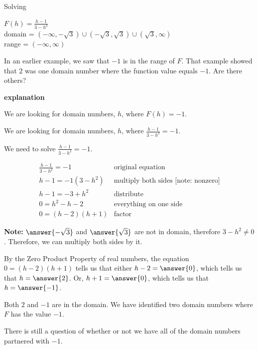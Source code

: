 \documentclass{ximera}
\begin{document}
\begin{example}   Solving 

$F(h) = \frac{h-1}{3-h^2}$ \\
domain = $(-\infty, -\sqrt{3}) \cup (-\sqrt{3}, \sqrt{3}) \cup (\sqrt{3}, \infty)$ \\
range = $(-\infty, \infty)$


In an earlier example, we saw that $-1$ is in the range of $F$.  That example showed that $2$ was one domain number where the function value equals $-1$. Are there others?



\textbf{\textcolor{red!75!green}{explanation}} 


We are looking for domain numbers, $h$, where $F(h) = -1$.  

We are looking for domain numbers, $h$, where $\frac{h-1}{3-h^2} = -1$.  

We need to solve $\frac{h-1}{3-h^2} = -1$.



\[
\begin{array}{ll}
\frac{h-1}{3-h^2} = -1 &  \text{original equation} \\
h - 1 = -1 (3-h^2)    &  \text{multiply both sides [note: nonzero]} \\
h - 1 = -3 + h^2    &      \text{distribute} \\
0 = h^2 - h - 2    &      \text{everything on one side} \\
0 =(h-2)(h+1)    &   \text{factor}   
\end{array}
\]



\textbf{Note:}  $\answer{-\sqrt{3}}$ and $\answer{\sqrt{3}}$ are not in domain, therefore $3 - h^2 \ne 0$. Therefore, we can multiply both sides by it.  



By the Zero Product Property of real numbers, the equation $0 =(h-2)(h+1)$ tells us that either $h-2 = \answer{0}$, which tells us that $h = \answer{2}$. Or, $h+1 = \answer{0}$, which tells us that $h = \answer{-1}$.

Both $2$ and $-1$ are in the domain.  We have identified two domain numbers where $F$ has the value $-1$.



\end{example}

There is still a question of whether or not we have all of the domain numbers partnered with $-1$. 
\end{document}
